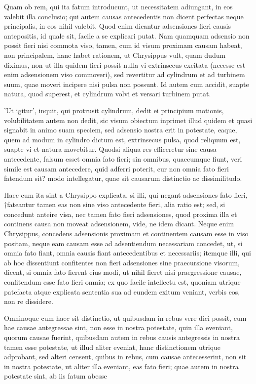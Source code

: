  Quam ob rem, qui ita fatum introducunt, ut necessitatem adiungant, in eos valebit illa conclusio; qui autem causas antecedentis non dicent perfectas neque principalis, in eos nihil valebit. Quod enim dicantur adsensiones fieri causis antepositis, id quale sit, facile a se explicari putat. Nam quamquam adsensio non possit fieri nisi commota viso, tamen, cum id visum proximam causam habeat, non principalem, hanc habet rationem, ut Chrysippus vult, quam dudum diximus, non ut illa quidem fieri possit nulla vi extrinsecus excitata (necesse est enim adsensionem viso commoveri), sed revertitur ad cylindrum et ad turbinem suum, quae moveri incipere nisi pulsa non possunt. Id autem cum accidit, suapte natura, quod superest, et cylindrum volvi et versari turbinem putat.

 'Ut igitur', inquit, qui protrusit cylindrum, dedit ei principium motionis, volubilitatem autem non dedit, sic visum obiectum inprimet illud quidem et quasi signabit in animo suam speciem, sed adsensio nostra erit in potestate, eaque, quem ad modum in cylindro dictum est, extrinsecus pulsa, quod reliquum est, suapte vi et natura movebitur. Quodsi aliqua res efficeretur sine causa antecedente, falsum esset omnia fato fieri; sin omnibus, quaecumque fiunt, veri simile est causam antecedere, quid adferri poterit, cur non omnia fato fieri fatendum sit? modo intellegatur, quae sit causarum distinctio ac dissimilitudo.

 Haec cum ita sint a Chrysippo explicata, si illi, qui negant adsensiones fato fieri, †fateantur tamen eas non sine viso antecedente fieri, alia ratio est; sed, si concedunt anteire visa, nec tamen fato fieri adsensiones, quod proxima illa et continens causa non moveat adsensionem, vide, ne idem dicant. Neque enim Chrysippus, concedens adsensionis proximam et continentem causam esse in viso positam, neque eam causam esse ad adsentiendum necessariam concedet, ut, si omnia fato fiant, omnia causis fiant antecedentibus et necessariis; itemque illi, qui ab hoc dissentiunt confitentes non fieri adsensiones sine praecursione visorum, dicent, si omnia fato fierent eius modi, ut nihil fieret nisi praegressione causae, confitendum esse fato fieri omnia; ex quo facile intellectu est, quoniam utrique patefacta atque explicata sententia sua ad eundem exitum veniant, verbis eos, non re dissidere.

 Omninoque cum haec sit distinctio, ut quibusdam in rebus vere dici possit, cum hae causae antegressae sint, non esse in nostra potestate, quin illa eveniant, quorum causae fuerint, quibusdam autem in rebus causis antegressis in nostra tamen esse potestate, ut illud aliter eveniat, hanc distinctionem utrique adprobant, sed alteri censent, quibus in rebus, cum causae antecesserint, non sit in nostra potestate, ut aliter illa eveniant, eas fato fieri; quae autem in nostra potestate sint, ab iis fatum abesse

